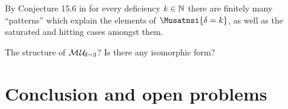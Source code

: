 \documentclass{report}
\begin{document}
\begin{conj}\label{con:mudelta}
By Conjecture 15.6 in \cite{h9} for every deficiency $k \in \mathbb{N}$ there are finitely many ``patterns'' which explain the elements of $\Musatnsi{\delta=k}$, as well as the saturated and hitting cases amongst them.
\end{conj}
 
\begin{quest}\label{que:str-3}
The structure of $\mathcal{M\hspace{0.8pt}U}_{\!\delta=3}$? Is there any isomorphic form?
\end{quest}
\chapter{Conclusion and open problems}
\label{cha:concl}

\newpage


\end{document}

